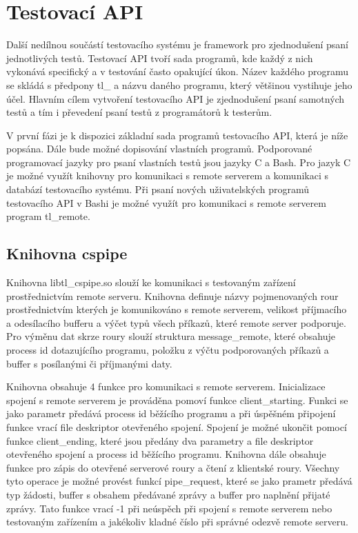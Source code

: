 \chapter{Testovací API}
Další nedílnou součástí testovacího systému je framework pro zjednodušení psaní jednotlivých testů. Testovací API tvoří sada programů, kde každý z nich vykonává specifický a v testování často opakující úkon. Název každého programu se skládá s předpony tl\_ a názvu daného programu, který většinou vystihuje jeho účel. Hlavním cílem vytvoření testovacího API je zjednodušení psaní samotných testů a tím i převedení psaní testů z programátorů k testerům.

V první fázi je k dispozici základní sada programů testovacího API, která je níže popsána. Dále bude možné dopisování vlastních programů. Podporované programovací jazyky pro psaní vlastních testů jsou jazyky C a Bash. Pro jazyk C je možné využít knihovny pro komunikaci s remote serverem a komunikaci s databází testovacího systému. Při psaní nových uživatelských programů testovacího API v Bashi je možné využít pro komunikaci s remote serverem program tl\_remote.

\section{Knihovna cspipe}
Knihovna libtl\_cspipe.so slouží ke komunikaci s testovaným zařízení prostřednictvím remote serveru. Knihovna definuje názvy pojmenovaných rour prostřednictvím kterých je komunikováno s remote serverem, velikost příjmacího a odesílacího bufferu a výčet typů všech příkazů, které remote server podporuje. Pro výměnu dat skrze roury slouží struktura message\_remote, které obsahuje process id dotazujícího programu, položku z výčtu podporovaných příkazů a buffer s posílanými či příjmanými daty.

Knihovna obsahuje 4 funkce pro komunikaci s remote serverem. Inicializace spojení s remote serverem je prováděna pomoví funkce client\_starting. Funkci se jako parametr předává process id běžícího programu a při úspěšném připojení funkce vrací file deskriptor otevřeného spojení. Spojení je možné ukončit pomocí funkce client\_ending, které jsou předány dva parametry a file deskriptor otevřeného spojení a process id běžícího programu. Knihovna dále obsahuje funkce pro zápis do otevřené serverové roury a čtení z klientské roury. Všechny tyto operace je možné provést funkcí pipe\_request, které se jako prametr předává typ žádosti, buffer s obsahem předávané zprávy a buffer pro naplnění přijaté zprávy. Tato funkce vrací -1 při neúspěch při spojení s remote serverem nebo testovaným zařízením a jakékoliv kladné číslo při správné odezvě remote serveru.

